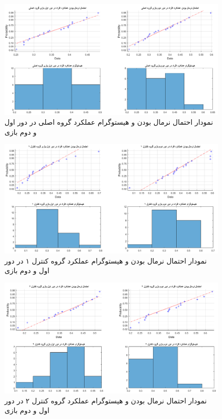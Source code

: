 \documentclass[twoside, a4paper,11pt]{book}
\numberwithin{equation}{chapter}
\numberwithin{table}{chapter}
\numberwithin{figure}{chapter}
\numberwithin{equation}{chapter}
\begin{document}
\begin{figure}
\centering
\includegraphics[scale=0.5]{Figures/p1sNorm.png}
\caption{\label{fig:p1sNorm}
نمودار احتمال نرمال بودن و هیستوگرام عملکرد گروه اصلی در دور اول و دوم بازی
}
\end{figure}

\begin{figure}
\centering
\includegraphics[scale=0.5]{Figures/p2sNorm.png}
\caption{\label{fig:p2sNorm}
نمودار احتمال نرمال بودن و هیستوگرام عملکرد گروه کنترل ۱ در دور اول و دوم بازی
}
\end{figure}

\begin{figure}
\centering
\includegraphics[scale=0.5]{Figures/p3sNorm.png}
\caption{\label{fig:p3sNorm}
نمودار احتمال نرمال بودن و هیستوگرام عملکرد گروه کنترل ۲ در دور اول و دوم بازی
}
\end{figure}
\end{document}
